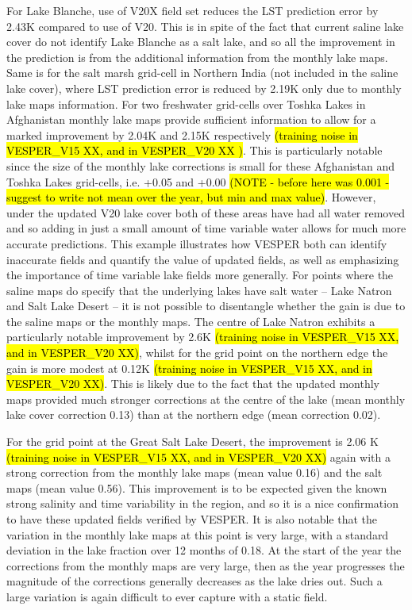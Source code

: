 \documentclass[hess, twostagejnl]{copernicus}
\begin{document}
\noindent For Lake Blanche, use of V20X field set reduces the LST prediction error by 2.43K compared to use of V20. This is in spite of the fact that current saline lake cover do not identify Lake Blanche as a salt lake, and so all the improvement in the prediction is from the additional information from the monthly lake maps. Same is for the salt marsh grid-cell in Northern India (not included in the saline lake cover), where LST prediction error is reduced by 2.19K only due to monthly lake maps information. For two freshwater grid-cells over Toshka Lakes in Afghanistan monthly lake maps provide sufficient information to allow for a marked improvement by 2.04K and 2.15K respectively \hl{(training noise in VESPER\_V15 XX, and in VESPER\_V20 XX )}. This is particularly notable since the size of the monthly lake corrections is small for these Afghanistan and Toshka Lakes grid-cells, i.e. +0.05 and +0.00 \hl{(NOTE - before here was 0.001 - suggest to write not mean over the year, but min and max value)}. However, under the updated V20 lake cover both of these areas have had all water removed and so adding in just a small amount of time variable water allows for much more accurate predictions. This example illustrates how VESPER both can identify inaccurate fields and quantify the value of updated fields, as well as emphasizing the importance of time variable lake fields more generally. For points where the saline maps do specify that the underlying lakes have salt water – Lake Natron and Salt Lake Desert – it is not possible to disentangle whether the gain is due to the saline maps or the monthly maps. The centre of Lake Natron exhibits a particularly notable improvement by 2.6K \hl{(training noise in VESPER\_V15 XX, and in VESPER\_V20 XX)}, whilst for the grid point on the northern edge the gain is more modest at 0.12K \hl{(training noise in VESPER\_V15 XX, and in VESPER\_V20 XX)}. This is likely due to the fact that the updated monthly maps provided much stronger corrections at the centre of the lake (mean monthly lake cover correction 0.13) than at the northern edge (mean correction 0.02). 


For the grid point at the Great Salt Lake Desert, the improvement is 2.06 K \hl{(training noise in VESPER\_V15 XX, and in VESPER\_V20 XX)} again with a strong correction from the monthly lake maps (mean value 0.16) and the salt maps (mean value 0.56). This improvement is to be expected given the known strong salinity and time variability in the region, and so it is a nice confirmation to have these updated fields verified by VESPER. It is also notable that the variation in the monthly lake maps at this point is very large, with a standard deviation in the lake fraction over 12 months of 0.18. At the start of the year the corrections from the monthly maps are very large, then as the year progresses the magnitude of the corrections generally decreases as the lake dries out. Such a large variation is again difficult to ever capture with a static field. \newline 
\end{document}
